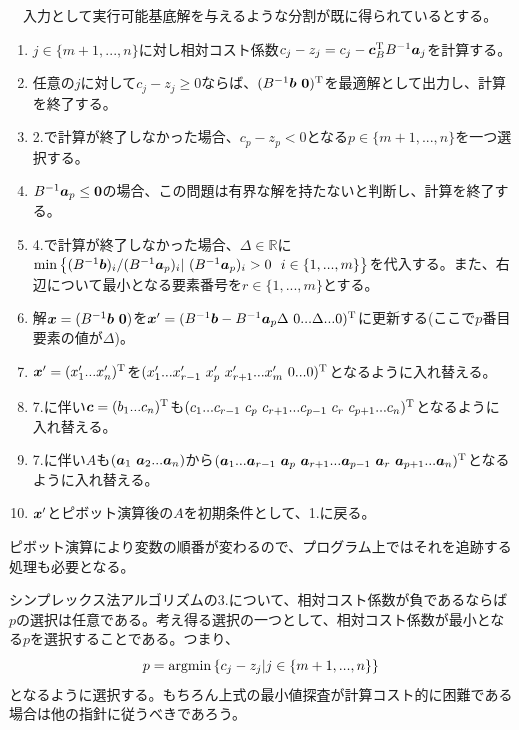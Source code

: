 \documentclass[dvipdfmx, 9pt, a4paper]{jsarticle}
\numberwithin{equation}{section}
\newcommand{\bm}[1]{{\mbox{\boldmath $#1$}}}
\begin{document}
\begin{tcolorbox}[title=シンプレックス法]
　入力として実行可能基底解を与えるような分割が既に得られているとする。
\begin{enumerate}
\item $j \in \{m+1, ..., n\}$に対し相対コスト係数$c_j-z_j=c_j-\bm c_B^{\rm T}B^{-1}\bm a_j$を計算する。
\item 任意の$j$に対して$c_j-z_j \geq 0$ならば、$(B^{-1}\bm b~\bm 0)^{\rm T}$を最適解として出力し、計算を終了する。
\item 2.で計算が終了しなかった場合、$c_p-z_p < 0$となる$p \in \{m+1, ..., n\}$を一つ選択する。
\item $B^{-1}\bm a_p \leq \bm 0$の場合、この問題は有界な解を持たないと判断し、計算を終了する。
\item 4.で計算が終了しなかった場合、$\Delta \in \mathbb{R}$に${\rm min} \left\{ (B^{-1}\bm b)_i/(B^{-1}\bm a_p)_i|~(B^{-1}\bm a_p)_i>0~~i \in \{1, ..., m\} \right\}$を代入する。また、右辺について最小となる要素番号を$r \in \{1, ..., m\}$とする。
\item 解$\bm x=(B^{-1}\bm b~\bm 0)$を$\bm x'=(B^{-1}\bm b - B^{-1}\bm a_p\Delta~0...\Delta...0)^{\rm T}$に更新する(ここで$p$番目要素の値が$\Delta$)。
\item $\bm x'=(x'_1...x'_n)^{\rm T}$を$(x'_1...x'_{r-1}~x'_p~x'_{r+1}...x'_m~0...0)^{\rm T}$となるように入れ替える。
\item 7.に伴い$\bm c=(b_1...c_n)^{\rm T}$も$(c_1...c_{r-1}~c_p~c_{r+1}...c_{p-1}~c_r~c_{p+1}...c_n)^{\rm T}$となるように入れ替える。
\item 7.に伴い$A$も$(\bm a_1~\bm a_2...\bm a_n)$から$(\bm a_1...\bm a_{r-1}~\bm a_p~\bm a_{r+1}...\bm a_{p-1}~\bm a_r~\bm a_{p+1}...\bm a_n)^{\rm T}$となるように入れ替える。
\item $\bm x'$とピボット演算後の$A$を初期条件として、1.に戻る。
\end{enumerate}
\end{tcolorbox}\par
ピボット演算により変数の順番が変わるので、プログラム上ではそれを追跡する処理も必要となる。\par
シンプレックス法アルゴリズムの3.について、相対コスト係数が負であるならば$p$の選択は任意である。考え得る選択の一つとして、相対コスト係数が最小となる$p$を選択することである。つまり、
\begin{equation}
p={\rm argmin}\left\{ c_j-z_j|j \in \{m+1, ..., n\} \right\}
\end{equation}
となるように選択する。もちろん上式の最小値探査が計算コスト的に困難である場合は他の指針に従うべきであろう。
\end{document}
